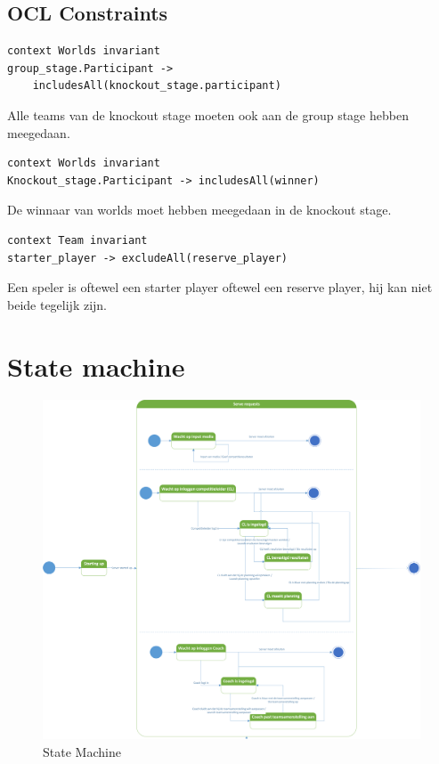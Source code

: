 \documentclass[12pt,a4paper]{article}
\begin{document}
			\subsection{OCL Constraints}
\begin{lstlisting}[frame=single, language=OCL]
context Worlds invariant
group_stage.Participant ->
	includesAll(knockout_stage.participant)
\end{lstlisting}
Alle teams van de knockout stage moeten ook aan de group stage hebben meegedaan. \\
		
\begin{lstlisting}[frame=single, language=OCL]	
context Worlds invariant
Knockout_stage.Participant -> includesAll(winner)
\end{lstlisting}
De winnaar van worlds moet hebben meegedaan in de knockout stage. \\
		
\begin{lstlisting}[frame=single, language=OCL]
context Team invariant
starter_player -> excludeAll(reserve_player)
\end{lstlisting}
Een speler is oftewel een starter player oftewel een reserve player, hij kan niet beide tegelijk zijn. \\
			
	\section{State machine}
		\begin{figure}[H]
			\includegraphics[width=\textwidth]{../6-StateMachine/Statechart.png}
			\caption{State Machine}
		\end{figure}
\end{document}
